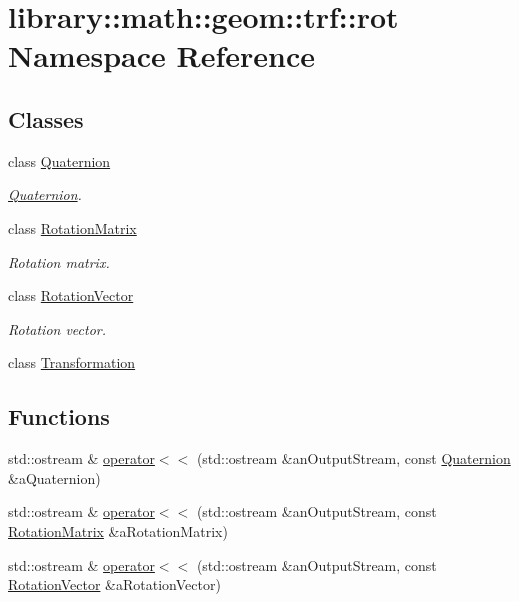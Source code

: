 \hypertarget{namespacelibrary_1_1math_1_1geom_1_1trf_1_1rot}{}\section{library\+:\+:math\+:\+:geom\+:\+:trf\+:\+:rot Namespace Reference}
\label{namespacelibrary_1_1math_1_1geom_1_1trf_1_1rot}
\subsection*{Classes}
\begin{DoxyCompactItemize}
\item 
class \hyperlink{classlibrary_1_1math_1_1geom_1_1trf_1_1rot_1_1_quaternion}{Quaternion}
\begin{DoxyCompactList}\small\item\em \hyperlink{classlibrary_1_1math_1_1geom_1_1trf_1_1rot_1_1_quaternion}{Quaternion}. \end{DoxyCompactList}\item 
class \hyperlink{classlibrary_1_1math_1_1geom_1_1trf_1_1rot_1_1_rotation_matrix}{Rotation\+Matrix}
\begin{DoxyCompactList}\small\item\em Rotation matrix. \end{DoxyCompactList}\item 
class \hyperlink{classlibrary_1_1math_1_1geom_1_1trf_1_1rot_1_1_rotation_vector}{Rotation\+Vector}
\begin{DoxyCompactList}\small\item\em Rotation vector. \end{DoxyCompactList}\item 
class \hyperlink{classlibrary_1_1math_1_1geom_1_1trf_1_1rot_1_1_transformation}{Transformation}
\end{DoxyCompactItemize}
\subsection*{Functions}
\begin{DoxyCompactItemize}
\item 
std\+::ostream \& \hyperlink{namespacelibrary_1_1math_1_1geom_1_1trf_1_1rot_a744f69ad8f762e90a76a2a6cc6fd01be}{operator$<$$<$} (std\+::ostream \&an\+Output\+Stream, const \hyperlink{classlibrary_1_1math_1_1geom_1_1trf_1_1rot_1_1_quaternion}{Quaternion} \&a\+Quaternion)
\item 
std\+::ostream \& \hyperlink{namespacelibrary_1_1math_1_1geom_1_1trf_1_1rot_ad165917bc52317d582576d20927ac6f6}{operator$<$$<$} (std\+::ostream \&an\+Output\+Stream, const \hyperlink{classlibrary_1_1math_1_1geom_1_1trf_1_1rot_1_1_rotation_matrix}{Rotation\+Matrix} \&a\+Rotation\+Matrix)
\item 
std\+::ostream \& \hyperlink{namespacelibrary_1_1math_1_1geom_1_1trf_1_1rot_aee5443a7034acee39fe2024a126eee49}{operator$<$$<$} (std\+::ostream \&an\+Output\+Stream, const \hyperlink{classlibrary_1_1math_1_1geom_1_1trf_1_1rot_1_1_rotation_vector}{Rotation\+Vector} \&a\+Rotation\+Vector)
\end{DoxyCompactItemize}


